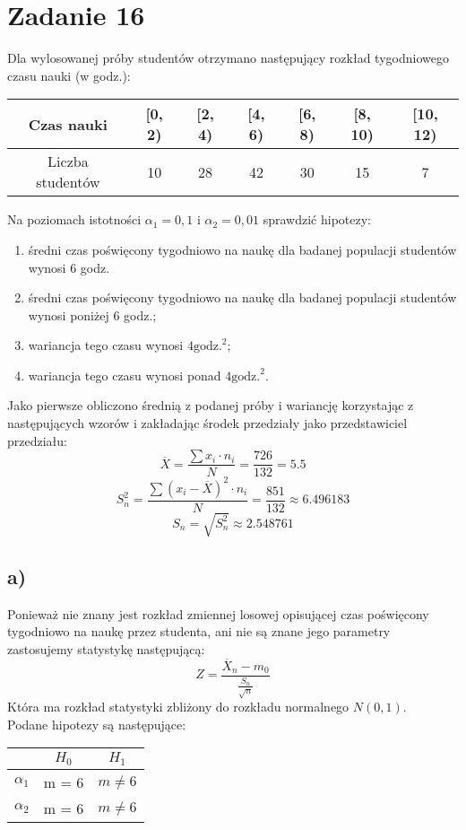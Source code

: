 \documentclass{article}
\begin{document}
\section{Zadanie 16}
Dla wylosowanej próby studentów otrzymano następujący rozkład tygodniowego czasu nauki (w godz.):
\begin{center} \begin{tabular}{|c|c|c|c|c|c|c|}
\hline
Czas nauki & [0, 2) & [2, 4) & [4, 6) & [6, 8) & [8, 10) & [10, 12) \\ \hline
Liczba studentów & 10 & 28 & 42 & 30 & 15 & 7 \\ \hline
\end{tabular} \end{center}
Na poziomach istotności $\alpha_1=0,1$ i $\alpha_2=0,01$ sprawdzić hipotezy:
\begin{enumerate}[label = \alph*)]
\item średni czas poświęcony tygodniowo na naukę dla badanej populacji studentów wynosi 6 godz.
\item średni czas poświęcony tygodniowo na naukę dla badanej populacji studentów wynosi poniżej 6 godz.;
\item wariancja tego czasu wynosi $4 \text{godz.}^2$;
\item wariancja tego czasu wynosi ponad $4 \text{godz.}^2$.
\end{enumerate}

Jako pierwsze obliczono średnią z podanej próby i wariancję korzystając z następujących wzorów i zakładając środek przedziały jako przedstawiciel przedziału:
\[ \overline{X}  = \frac{\sum x_i \cdot n_i}{N} = \frac{726}{132} = 5.5 \]
\[ S_n^2 = \frac{\sum (x_i - \overline{X})^2 \cdot n_i}{N} = \frac{851}{132} \approx 6.496183 \]
\[ S_n = \sqrt{S_n^2} \approx 2.548761 \]

\subsection{a)}
Ponieważ nie znany jest rozkład zmiennej losowej opisującej czas poświęcony tygodniowo na naukę przez studenta, ani nie są znane jego parametry zastosujemy statystykę następującą:
\[ Z = \frac{\overline{X}_n - m_0}{\frac{S_n}{\sqrt{n}}} \]
Która ma rozkład statystyki zbliżony do rozkładu normalnego $N(0,1)$. \\
Podane hipotezy są następujące:
\begin{center} \begin{tabular}{|c|c|c|} \hline
 & $H_0$ & $H_1$ \\ \hline
$\alpha_1$ & m = 6 & $m \neq 6$ \\ \hline
$\alpha_2$ & m = 6 & $m \neq 6$ \\ \hline
\end{tabular} \end{center}
\end{document}
